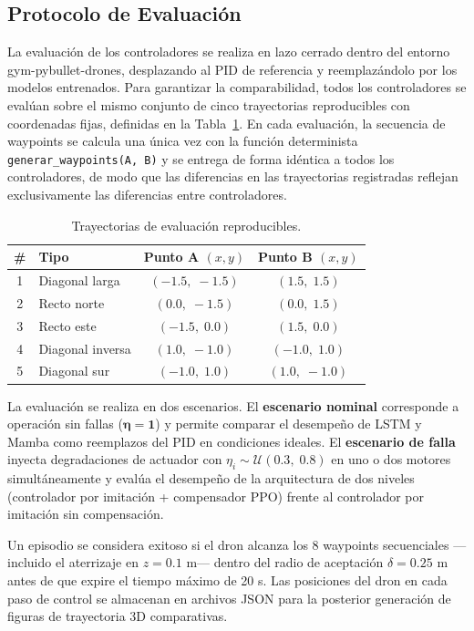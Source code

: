 \subsection{Protocolo de Evaluación}
\label{sec:evaluacion}

La evaluación de los controladores se realiza en lazo cerrado dentro del entorno gym-pybullet-drones, desplazando al PID de referencia y reemplazándolo por los modelos entrenados. Para garantizar la comparabilidad, todos los controladores se evalúan sobre el mismo conjunto de cinco trayectorias reproducibles con coordenadas fijas, definidas en la Tabla~\ref{tab:trayectorias}. En cada evaluación, la secuencia de waypoints se calcula una única vez con la función determinista \texttt{generar\_waypoints(A, B)} y se entrega de forma idéntica a todos los controladores, de modo que las diferencias en las trayectorias registradas reflejan exclusivamente las diferencias entre controladores.

\begin{table}[h]
\centering
\caption{Trayectorias de evaluación reproducibles.}
\label{tab:trayectorias}
\begin{tabular}{clcc}
\hline
\textbf{\#} & \textbf{Tipo} & \textbf{Punto A $(x,y)$} & \textbf{Punto B $(x,y)$} \\
\hline
1 & Diagonal larga & $(-1.5,\; -1.5)$ & $(1.5,\; 1.5)$ \\
2 & Recto norte & $(0.0,\; -1.5)$ & $(0.0,\; 1.5)$ \\
3 & Recto este & $(-1.5,\; 0.0)$ & $(1.5,\; 0.0)$ \\
4 & Diagonal inversa & $(1.0,\; -1.0)$ & $(-1.0,\; 1.0)$ \\
5 & Diagonal sur & $(-1.0,\; 1.0)$ & $(1.0,\; -1.0)$ \\
\hline
\end{tabular}
\end{table}

La evaluación se realiza en dos escenarios. El \textbf{escenario nominal} corresponde a operación sin fallas ($\boldsymbol{\eta} = \mathbf{1}$) y permite comparar el desempeño de LSTM y Mamba como reemplazos del PID en condiciones ideales. El \textbf{escenario de falla} inyecta degradaciones de actuador con $\eta_i \sim \mathcal{U}(0.3,\; 0.8)$ en uno o dos motores simultáneamente y evalúa el desempeño de la arquitectura de dos niveles (controlador por imitación + compensador PPO) frente al controlador por imitación sin compensación.

Un episodio se considera exitoso si el dron alcanza los 8 waypoints secuenciales —incluido el aterrizaje en $z=0.1$ m— dentro del radio de aceptación $\delta = 0.25$ m antes de que expire el tiempo máximo de 20 s. Las posiciones del dron en cada paso de control se almacenan en archivos JSON para la posterior generación de figuras de trayectoria 3D comparativas.


